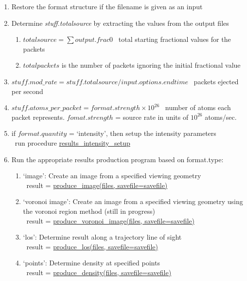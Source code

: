 \documentclass[11pt]{article}
\begin{document}
\begin{enumerate}
\item Restore the format structure if the filename is given as an input

\item Determine \textit{stuff.totalsource} by extracting the values from the 
  output files 
  \begin{enumerate}
  \item $totalsource = \sum output.frac0$ \rarrow\ total starting fractional 
    values for the packets
  \item $totalpackets$ is the number of packets ignoring the initial fractional 
    value
  \end{enumerate}

\item $stuff.mod\_rate = stuff.totalsource / input.options.endtime$ \rarrow\ 
  packets ejected per second

\item $stuff.atoms\_per\_packet = format.strength \times 10^{26}$ \rarrow\ 
  number of atoms each packet represents. $fomat.strength$ = source rate in 
  units of $10^{26}$ atoms/sec.

\item if $format.quantity$ = `intensity', then setup the intensity parameters \\
  \textbullet\ run procedure 
  \hyperref[intensitysetup]{results\_intensity\_setup}

\item Run the appropriate results production program based on format.type:
  \begin{enumerate}
  \item `image': Create an image from a specified viewing geometry \\
    \textbullet\ result = 
    \hyperref[image]{produce\_image(files, savefile=savefile)}
  \item `voronoi image': Create an image from a specified viewing geometry 
  using the voronoi region method (still in progress) \\
    \textbullet\ result = 
    \hyperref[voronoiimage]{produce\_voronoi\_image(files, savefile=savefile)}
  \item `los': Determine result along a trajectory line of sight \\
    \textbullet\ result = \hyperref[los]{produce\_los(files, savefile=savefile)} 
  \item `points': Determine density at specified points \\ 
    \textbullet\ result = 
    \hyperref[points]{produce\_density(files, savefile=savefile)}
  \end{enumerate}
\end{enumerate}
\end{document}
